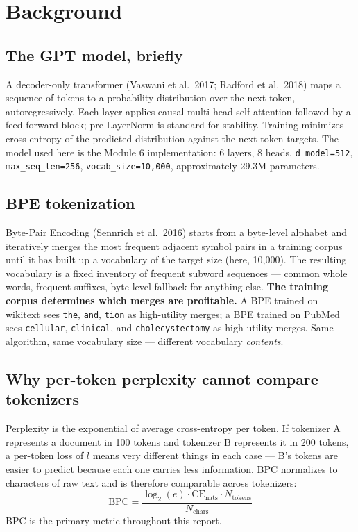 \documentclass[11pt]{article}
\begin{document}
\section{Background}

\subsection{The GPT model, briefly}

A decoder-only transformer (Vaswani et al.\ 2017; Radford et al.\ 2018) maps a sequence of tokens to a probability distribution over the next token, autoregressively. Each layer applies causal multi-head self-attention followed by a feed-forward block; pre-LayerNorm is standard for stability. Training minimizes cross-entropy of the predicted distribution against the next-token targets. The model used here is the Module 6 implementation: 6 layers, 8 heads, \texttt{d\_model=512}, \texttt{max\_seq\_len=256}, \texttt{vocab\_size=10{,}000}, approximately 29.3M parameters.

\subsection{BPE tokenization}

Byte-Pair Encoding (Sennrich et al.\ 2016) starts from a byte-level alphabet and iteratively merges the most frequent adjacent symbol pairs in a training corpus until it has built up a vocabulary of the target size (here, 10,000). The resulting vocabulary is a fixed inventory of frequent subword sequences --- common whole words, frequent suffixes, byte-level fallback for anything else. \textbf{The training corpus determines which merges are profitable.} A BPE trained on wikitext sees \texttt{the}, \texttt{and}, \texttt{tion} as high-utility merges; a BPE trained on PubMed sees \texttt{cellular}, \texttt{clinical}, and \texttt{cholecystectomy} as high-utility merges. Same algorithm, same vocabulary size --- different vocabulary \emph{contents}.

\subsection{Why per-token perplexity cannot compare tokenizers}

Perplexity is the exponential of average cross-entropy per token. If tokenizer A represents a document in 100 tokens and tokenizer B represents it in 200 tokens, a per-token loss of $l$ means very different things in each case --- B's tokens are easier to predict because each one carries less information. BPC normalizes to characters of raw text and is therefore comparable across tokenizers:
\begin{equation}
\mathrm{BPC} = \frac{\log_2(e) \cdot \mathrm{CE}_{\text{nats}} \cdot N_{\text{tokens}}}{N_{\text{chars}}}
\end{equation}
BPC is the primary metric throughout this report.
\end{document}

